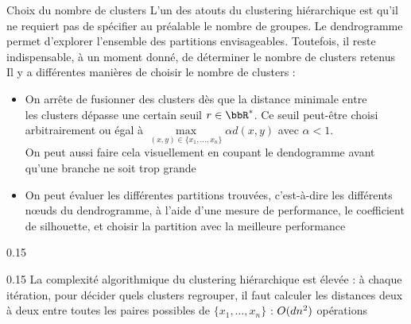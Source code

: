 \documentclass[10pt]{beamer}
\newcommand{\hsp}{\hspace*{1em}}
\begin{document}
\begin{frame}{Choix du nombre de clusters}
		\vspace*{-0.6em}
L’un des atouts du clustering hiérarchique est qu’il ne requiert pas de spécifier au préalable le nombre de groupes. Le dendrogramme permet d’explorer l’ensemble des partitions envisageables. Toutefois, il reste indispensable, à un moment donné, de déterminer le nombre de clusters retenus\\[0.8em]

Il y a différentes manières de choisir le nombre de clusters :\\[0.8em]

\begin{itemize}
	\item On arrête de fusionner des clusters dès que la distance minimale entre \\les clusters dépasse une certain seuil $r \in \bbR^*$. Ce seuil peut-être choisi arbitrairement ou égal à $\underset{(x,y) \in \{x_1,\dots,x_n\}}{\max}\alpha d(x,y)$ avec $\alpha <1$. \\[0.1em] On peut aussi faire cela visuellement en coupant le dendogramme avant qu'une branche ne soit trop grande\\[0.5em]
	\item On peut évaluer les différentes partitions trouvées, c’est-à-dire les différents nœuds du dendrogramme, à l’aide d’une mesure de performance, \eg le coefficient de silhouette, et choisir la partition avec la meilleure performance\\[1em]
	
\end{itemize}

	\begin{minipc}[0.06]{0.15}
	\warning
\end{minipc}
\begin{minipc}[0.92]{0.15}
La complexité algorithmique du clustering hiérarchique est élevée : à chaque itération, pour décider quels clusters regrouper, il faut calculer les distances deux à deux entre toutes les paires possibles de $\{x_1,\dots,x_n\}$ : $\color{black}O(dn^2)$ opérations
\end{minipc}
\end{frame}
\end{document}
